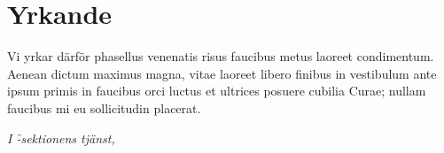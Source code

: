 \documentclass[proposition]{fclass}
\begin{document}



\section*{Yrkande}
Vi yrkar därför
\batt
phasellus venenatis risus faucibus metus laoreet condimentum. Aenean dictum maximus magna, vitae laoreet libero finibus in
\eatt
\batt
vestibulum ante ipsum primis in faucibus orci luctus et ultrices posuere cubilia Curae; nullam faucibus mi eu sollicitudin placerat. 
\eatt




\begin{signblock}
\vspace{15mm}
\emph{I \f -sektionens tjänst, } %
\end{signblock}

\end{document}

